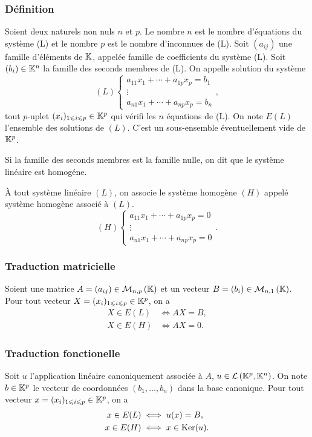 \subsubsection{Définition}
\begin{defdef}
  Soient deux naturels non nuls $n$ et $p$. Le nombre $n$ est le nombre d'équations du système (L) et le nombre $p$ est le nombre d'inconnues de (L). Soit $(a_{ij})$ une famille d'éléments de $\mathbb{K}$, appelée famille de coefficients du système (L). Soit $(b_i) \in \mathbb{K}^n$ la famille des seconds membres de (L). On appelle solution du système
  \begin{equation}
    (L)
    \begin{cases}
      a_{11}x_1 + \dotsb +a_{1p}x_p = b_1 \\
      \vdots \\
      a_{n1}x_1 + \dotsb +a_{np}x_p = b_n
    \end{cases},
  \end{equation}
  tout $p$-uplet $(x_i)_{1\leqslant i\leqslant p} \in \mathbb{K}^p$ qui vérifi les $n$ équations de (L). On note $E(L)$ l'ensemble des solutions de $(L)$. C'est un sous-ensemble éventuellement vide de $\mathbb{K}^p$.
\end{defdef}
%
\begin{defdef}
  Si la famille des seconds membres est la famille nulle, on dit que le système linéaire est homogéne.
\end{defdef}
%
À tout système linéaire $(L)$, on associe le système homogène $(H)$ appelé système homogène associé à $(L)$.
\begin{equation}
  (H)
  \begin{cases}
    a_{11}x_1 + \dotsb +a_{1p}x_p = 0 \\
    \vdots \\
    a_{n1}x_1 + \dotsb +a_{np}x_p = 0
  \end{cases}.
\end{equation}
%
\subsubsection{Traduction matricielle}
Soient une matrice $A=(a_{ij}) \in \mathcal{M}_{n,p}\left(\mathbb{K}\right)$ et un vecteur $B=(b_{i}) \in \mathcal{M}_{n,1}\left(\mathbb{K}\right)$. Pour tout vecteur $X=(x_i)_{1\leqslant i \leqslant p} \in \mathbb{K}^p$, on a
\begin{align}
  X \in E(L) &\iff AX=B, \\
  X \in E(H) &\iff AX=0.
\end{align}
%
\subsubsection{Traduction fonctionelle}
Soit $u$ l'application linéaire canoniquement associée à $A$, $u \in \mathcal{L}\left(\mathbb{K}^p,\mathbb{K}^n\right)$. On note $b \in \mathbb{K}^p$ le vecteur de coordonnées $(b_1, \ldots, b_n)$ dans la base canonique. Pour tout vecteur $x=(x_i)_{1\leqslant i \leqslant p} \in \mathbb{K}^p$, on a
\begin{align}
  x \in E(L) &\iff u(x)=B, \\
  x \in E(H) &\iff x\in\operatorname{Ker}(u).
\end{align}

